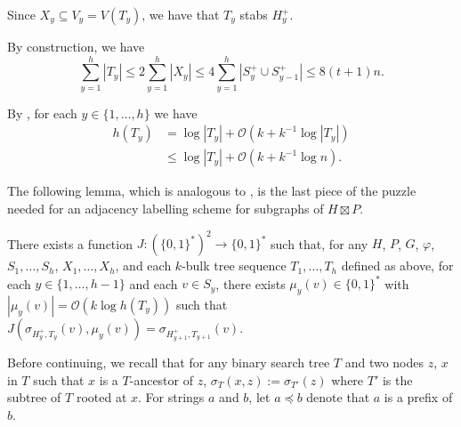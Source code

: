 \documentclass[kpfonts]{patmorin}
\newcommand{\Oh}{\mathcal{O}}
\let\le\leqslant
\let\leq\leqslant
\let\preceq\preccurlyeq
\begin{document}
Since $X_y \subseteq V_y = V(T_y)$, we have that $T_y$ stabs $H^+_y$.

By construction, we have
\[
\textstyle\sum_{y=1}^h |T_y| \le 2\textstyle\sum_{y=1}^h |X_y| \le 4\textstyle\sum_{y=1}^h |S^+_y\cup S^+_{y-1}| \le 8(t+1)n.
\]

By , for each $y\in\{1,\ldots,h\}$ we have
\begin{align*}
h(T_y)&= \log |T_y| + \Oh(k+k^{-1}\log |T_y|)\\
&\leq \log |T_y| + \Oh(k+k^{-1}\log n).
\end{align*}

The following lemma, which is analogous to , is the last piece of the puzzle needed for an adjacency labelling scheme for subgraphs of $H\boxtimes P$. 

\begin{lem}
  There exists a function $J:(\{0,1\}^*)^2\to \{0,1\}^*$ such that, 
  for any $H$, $P$, $G$, $\varphi$, $S_1,\ldots,S_h$, $X_1,\ldots,X_h$, and each $k$-bulk tree sequence $T_1,\ldots,T_h$ defined as above, for each $y\in\{1,\ldots,h-1\}$ and each $v\in S_y$, there exists $\mu_y(v)\in\{0,1\}^*$ with $|\mu_y(v)|= \Oh(k\log h(T_y))$ such that $J(\sigma_{H^+_y,T_y}(v), \mu_y(v))=\sigma_{H^+_{y+1},T_{y+1}}(v)$.
\end{lem}

Before continuing, we recall that for any binary search tree $T$ and two nodes $z$, $x$ in $T$ such that $x$ is a $T$-ancestor of $z$, $\sigma_T(x,z):=\sigma_{T'}(z)$ where $T'$ is the subtree of $T$ rooted at $x$.
For strings $a$ and $b$, let $a\preceq b$ denote that $a$ is a prefix of $b$.
\end{document}
